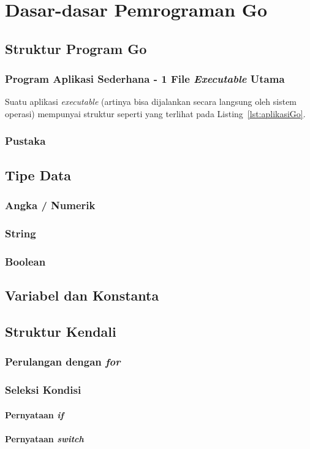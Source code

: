 \chapter{Dasar-dasar Pemrograman Go}

\section{Struktur Program Go}

\subsection{Program Aplikasi Sederhana - 1 File \textit{Executable} Utama}

Suatu aplikasi \textit{executable} (artinya bisa dijalankan secara langsung oleh sistem operasi) mempunyai struktur seperti yang terlihat pada Listing~\ref{lst:aplikasiGo}.



\subsection{Pustaka}


\section{Tipe Data}

\subsection{Angka / Numerik}

\subsection{String}

\subsection{Boolean}


\section{Variabel dan Konstanta}


\section{Struktur Kendali}

\subsection{Perulangan dengan \textit{for}}


\subsection{Seleksi Kondisi}

\subsubsection{Pernyataan \textit{if}}


\subsubsection{Pernyataan \textit{switch}}


